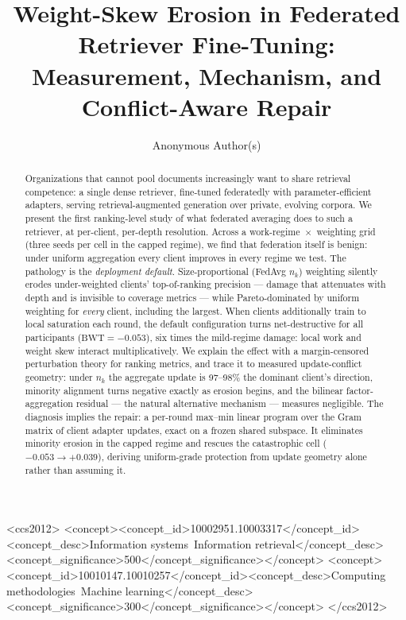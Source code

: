 \documentclass[sigconf,anonymous,review]{acmart}
\title[Weight-Skew Erosion in Federated Retriever Fine-Tuning]{Weight-Skew Erosion in Federated Retriever Fine-Tuning:\\ Measurement, Mechanism, and Conflict-Aware Repair}
\author{Anonymous Author(s)}
\affiliation{\institution{Anonymous Institution}\city{}\country{}}
\newcommand{\BWT}{\mathrm{BWT}}
\begin{document}
\begin{abstract}
Organizations that cannot pool documents increasingly want to share retrieval competence: a single dense retriever, fine-tuned federatedly with parameter-efficient adapters, serving retrieval-augmented generation over private, evolving corpora. We present the first ranking-level study of what federated averaging does to such a retriever, at per-client, per-depth resolution. Across a work-regime~$\times$~weighting grid (three seeds per cell in the capped regime), we find that federation itself is benign: under uniform aggregation every client improves in every regime we test. The pathology is the \emph{deployment default}. Size-proportional (FedAvg $n_k$) weighting silently erodes under-weighted clients' top-of-ranking precision --- damage that attenuates with depth and is invisible to coverage metrics --- while Pareto-dominated by uniform weighting for \emph{every} client, including the largest. When clients additionally train to local saturation each round, the default configuration turns net-destructive for all participants ($\BWT=-0.053$), six times the mild-regime damage: local work and weight skew interact multiplicatively. We explain the effect with a margin-censored perturbation theory for ranking metrics, and trace it to measured update-conflict geometry: under $n_k$ the aggregate update is 97--98\% the dominant client's direction, minority alignment turns negative exactly as erosion begins, and the bilinear factor-aggregation residual --- the natural alternative mechanism --- measures negligible. The diagnosis implies the repair: a per-round max--min linear program over the Gram matrix of client adapter updates, exact on a frozen shared subspace. It eliminates minority erosion in the capped regime and rescues the catastrophic cell ($-0.053\rightarrow+0.039$), deriving uniform-grade protection from update geometry alone rather than assuming it.
\end{abstract}

\begin{CCSXML}
<ccs2012>
<concept><concept_id>10002951.10003317</concept_id><concept_desc>Information systems~Information retrieval</concept_desc><concept_significance>500</concept_significance></concept>
<concept><concept_id>10010147.10010257</concept_id><concept_desc>Computing methodologies~Machine learning</concept_desc><concept_significance>300</concept_significance></concept>
</ccs2012>
\end{CCSXML}
\end{document}
